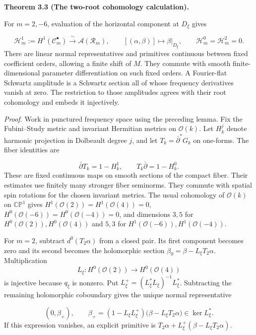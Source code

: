 \documentclass[
  english,
  11pt,
  reqno]{amsart}
\makeatletter
\newcommand{\pandocstatementheading}[1]{%
  \par\addpenalty{\@beginparpenalty}%
  \addvspace{.5\baselineskip plus .2\baselineskip minus .2\baselineskip}%
  {\normalfont\bfseries #1\par}%
  \nobreak\@afterindenttrue\@afterheading
}
\makeatother
\begin{document}
\pandocstatementheading{\leavevmode{}\label{thm:online-moderate-root-cohomology}Theorem 3.3 (The two-root cohomology calculation).}

For \(m=2,-6\), evaluation of the horizontal component at \(D_\xi\)
gives

\label{eq:online-root-cohomology-isomorphism} \[
\mathscr H_m^1:=H^1(\mathscr C_m^\bullet)
\xrightarrow{\ \sim\ }\mathscr A(\mathcal R_m),
\qquad[(\alpha,\beta)]\longmapsto\beta|_{D_\xi},
\qquad
\mathscr H_m^0=\mathscr H_m^2=0.
\] There are linear normal representatives and primitives continuous
between fixed coefficient orders, allowing a finite shift of \(M\). They
commute with smooth finite-dimensional parameter differentiation on such
fixed orders. A Fourier-flat Schwartz amplitude is a Schwartz section
all of whose frequency derivatives vanish at zero. The restriction to
those amplitudes agrees with their root cohomology and embeds it
injectively.

\emph{Proof.} Work in punctured frequency space using the preceding
lemma. Fix the Fubini--Study metric and invariant Hermitian metrics on
\(\mathcal O(k)\). Let \(H_k^j\) denote harmonic projection in Dolbeault
degree \(j\), and let \(T_k=\bar\partial^*G_k\) on one-forms. The fiber
identities are

\label{eq:online-root-fiber-homotopy} \[
\bar\partial T_k=1-H_k^1,
\qquad
T_k\bar\partial=1-H_k^0.
\] These are fixed continuous maps on smooth sections of the compact
fiber. Their estimates use finitely many stronger fiber seminorms. They
commute with spatial spin rotations for the chosen invariant metrics.
The usual cohomology of \(\mathcal O(k)\) on \(\mathbb{CP}^1\) gives
\(H^1(\mathcal O(2))=H^1(\mathcal O(4))=0\),
\(H^0(\mathcal O(-6))=H^0(\mathcal O(-4))=0\), and dimensions \(3,5\)
for \(H^0(\mathcal O(2)),H^0(\mathcal O(4))\) and \(5,3\) for
\(H^1(\mathcal O(-6)),H^1(\mathcal O(-4))\).

For \(m=2\), subtract \(d^0(T_2\alpha)\) from a closed pair. Its first
component becomes zero and its second becomes the holomorphic section
\(\beta_0=\beta-L_\xi T_2\alpha\). Multiplication \[
L_\xi:H^0(\mathcal O(2))\longrightarrow H^0(\mathcal O(4))
\] is injective because \(q_\xi\) is nonzero. Put
\(L_\xi^+=(L_\xi^*L_\xi)^{-1}L_\xi^*\). Subtracting the remaining
holomorphic coboundary gives the unique normal representative

\label{eq:online-root-positive-normal-form} \[
(0,\beta_+),
\qquad
\beta_+=(1-L_\xi L_\xi^+)\bigl(\beta-L_\xi T_2\alpha\bigr)
\in\ker L_\xi^*.
\] If this expression vanishes, an explicit primitive is
\(T_2\alpha+L_\xi^+(\beta-L_\xi T_2\alpha)\).
\end{document}
